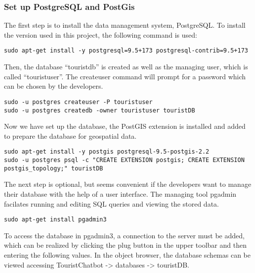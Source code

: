 \subsubsection{Set up PostgreSQL and PostGis}
The first step is to install the data management system, PostgreSQL. To install the version used in this project, the following command is used:
\begin{lstlisting}
sudo apt-get install -y postgresql=9.5+173 postgresql-contrib=9.5+173 
\end{lstlisting}
Then, the database “touristdb” is created as well as the managing user, which is called “touristuser”. The createuser command will prompt for a password which can be chosen by the developers.
\begin{lstlisting}
sudo -u postgres createuser -P touristuser
sudo -u postgres createdb -owner touristuser touristDB
\end{lstlisting}
Now we have set up the database, the PostGIS extension is installed and added to prepare the database for geospatial data.
\begin{lstlisting}
sudo apt-get install -y postgis postgresql-9.5-postgis-2.2
sudo -u postgres psql -c "CREATE EXTENSION postgis; CREATE EXTENSION postgis_topology;" touristDB
\end{lstlisting}
The next step is optional, but seems convenient if the developers want to manage their database with the help of a user interface. The managing tool pgadmin facilates running and editing SQL queries and viewing the stored data.
\begin{lstlisting}
sudo apt-get install pgadmin3
\end{lstlisting}
To access the database in pgadmin3, a connection to the server must be added, which can be realized by clicking the plug button in the upper toolbar and then entering the following values.
In the object browser, the database schemas can be viewed accessing TouristChatbot -> databases -> touristDB.

